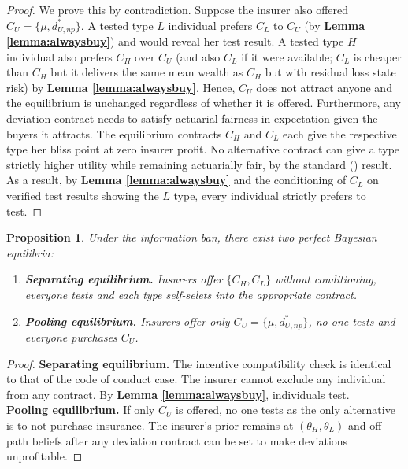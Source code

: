 \documentclass[nonatbib,preprint,12pt]{elsarticle}
\theoremstyle{plain}
\newtheorem{prop}[theorem]{Proposition}
\theoremstyle{definition}
\theoremstyle{plain}
\theoremstyle{TheoremNum}
\theoremstyle{CorollaryNum}
\theoremstyle{PropositionNum}
\theoremstyle{TheoremNum}
\begin{document}
\begin{proof}
    We prove this by contradiction. Suppose the insurer also offered $C_U = \{\mu, d_{U,np}^*\}$. A tested type $L$ individual prefers $C_L$ to $C_U$ (by \textbf{Lemma \ref{lemma:alwaysbuy}}) and would reveal her test result. A tested type $H$ individual also prefers $C_H$ over $C_U$ (and also $C_L$ if it were available; $C_L$ is cheaper than $C_H$ but it delivers the same mean wealth as $C_H$ but with residual loss state risk) by \textbf{Lemma \ref{lemma:alwaysbuy}}. Hence, $C_U$ does not attract anyone and the equilibrium is unchanged regardless of whether it is offered. Furthermore, any deviation contract needs to satisfy actuarial fairness in expectation given the buyers it attracts. The equilibrium contracts $C_H$ and $C_L$ each give the respective type her bliss point at zero insurer profit. No alternative contract can give a type strictly higher utility while remaining actuarially fair, by the standard \citeauthor{mossin1968aspects} (\citeyear{mossin1968aspects}) result. As a result, by \textbf{Lemma \ref{lemma:alwaysbuy}} and the conditioning of $C_L$ on verified test results showing the $L$ type, every individual strictly prefers to test.
\end{proof}

\begin{prop}\label{prop:ibeqnoprinciple}
     Under the information ban, there exist two perfect Bayesian equilibria:
    \begin{enumerate}
        \item \textbf{Separating equilibrium.} Insurers offer $\{C_H, C_L\}$ without conditioning, everyone tests and each type self-selets into the appropriate contract.
        \item \textbf{Pooling equilibrium.} Insurers offer only $C_U = \{\mu, d_{U,np}^*\}$, no one tests and everyone purchases $C_U$.
    \end{enumerate}
\end{prop}

\begin{proof}
    \textbf{Separating equilibrium.} The incentive compatibility check is identical to that of the code of conduct case. The insurer cannot exclude any individual from any contract. By \textbf{Lemma \ref{lemma:alwaysbuy}}, individuals test. \\
    \textbf{Pooling equilibrium.} If only $C_U$ is offered, no one tests as the only alternative is to not purchase insurance. The insurer's prior remains at $(\theta_H,\theta_L)$ and off-path beliefs after any deviation contract can be set to make deviations unprofitable.
\end{proof}
\end{document}
